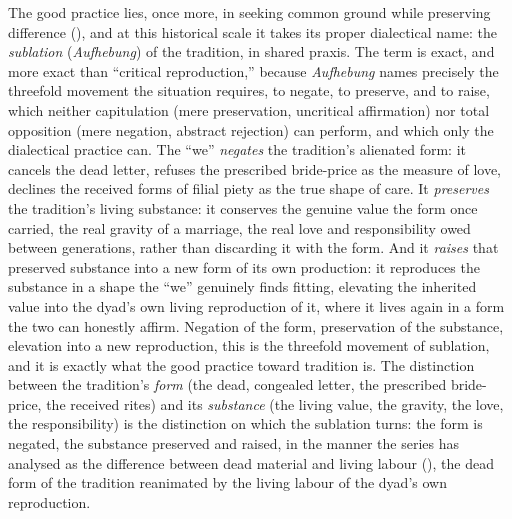 The good practice lies, once more, in seeking common ground while preserving difference (), and at this historical scale it takes its proper dialectical name: the \emph{sublation} (\emph{Aufhebung}) of the tradition, in shared praxis. The term is exact, and more exact than ``critical reproduction,'' because \emph{Aufhebung} names precisely the threefold movement the situation requires, to negate, to preserve, and to raise, which neither capitulation (mere preservation, uncritical affirmation) nor total opposition (mere negation, abstract rejection) can perform, and which only the dialectical practice can. The ``we'' \emph{negates} the tradition's alienated form: it cancels the dead letter, refuses the prescribed bride-price as the measure of love, declines the received forms of filial piety as the true shape of care. It \emph{preserves} the tradition's living substance: it conserves the genuine value the form once carried, the real gravity of a marriage, the real love and responsibility owed between generations, rather than discarding it with the form. And it \emph{raises} that preserved substance into a new form of its own production: it reproduces the substance in a shape the ``we'' genuinely finds fitting, elevating the inherited value into the dyad's own living reproduction of it, where it lives again in a form the two can honestly affirm. Negation of the form, preservation of the substance, elevation into a new reproduction, this is the threefold movement of sublation, and it is exactly what the good practice toward tradition is. The distinction between the tradition's \emph{form} (the dead, congealed letter, the prescribed bride-price, the received rites) and its \emph{substance} (the living value, the gravity, the love, the responsibility) is the distinction on which the sublation turns: the form is negated, the substance preserved and raised, in the manner the series has analysed as the difference between dead material and living labour (), the dead form of the tradition reanimated by the living labour of the dyad's own reproduction.

